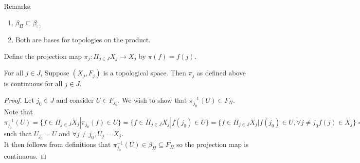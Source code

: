 Remarks: 
\begin{enumerate}
	\item $\beta_{\Pi} \subseteq \beta_{\Box}$ 
	\item Both are bases for topologies on the product. 
\end{enumerate}
\begin{definition}
	Define the projection map $\pi_j : \Pi_{j \in J}X_j \rightarrow X_j$ by $\pi(f) = f(j)$. 
\end{definition}
\begin{lemma}
	For all $j \in J$, Suppose $(X_j, F_j)$ is a topological space. Then $\pi_j$ as defined above is continuous for all $j \in J$. 
\end{lemma}
\begin{proof}
	Let $j_{0} \in J$ and consider $U \in F_{j_{0}}$. We wish to show that $\pi_{j_{0}}^{-1}(U) \in F_{\Pi}$. Note that $\pi_{j_{0}}^{-1}(U) = \{f \in \Pi_{j \in J}X_j | \pi_{j_{0}}(f) \in U\} = \{f \in \Pi_{j \in J}X_j | f(j_{0}) \in U\} = \{f \in \Pi_{j \in J}X_j | f(j_{0}) \in U, \forall j \neq j_{0} f(j) \in X_{j}\}= \Pi_{j \in J} U_j$ such that $U_{j_{0}} = U$ and $\forall j \neq j_{0}, U_j = X_j$.\\
	It then follows from definitions that $\pi_{j_{0}}^{-1}(U) \in \beta_{\Pi} \subseteq F_{\Pi}$ so the projection map is continuous. 
\end{proof}

